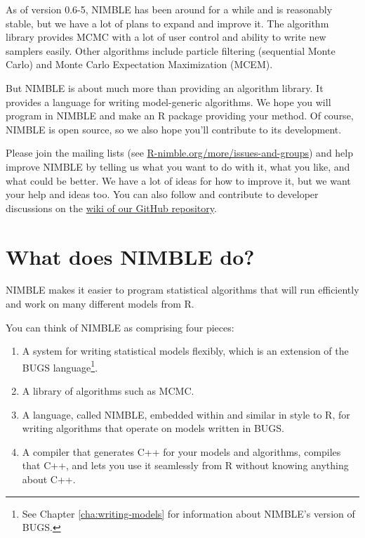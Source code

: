 \documentclass[12pt,oneside]{book}\usepackage[]{graphicx}\usepackage[]{color}
\newcommand{\ver}{0.6-5}
\begin{document}
As of version \ver, NIMBLE has been around for a while and is reasonably
stable, but we have a lot of plans to expand and improve it.  The
algorithm library provides MCMC with a lot of user control and ability
to write new samplers easily.  Other algorithms include particle
filtering (sequential Monte Carlo) and Monte Carlo Expectation
Maximization (MCEM).  

But NIMBLE is about much more than providing an algorithm library.  It
provides a language for writing model-generic algorithms.  We hope you
will program in NIMBLE and make an R package providing your method.
Of course, NIMBLE is open source, so we also hope you'll contribute to
its development.

Please join the mailing lists
(see \href{https://r-nimble.org/more/issues-and-groups}{R-nimble.org/more/issues-and-groups}) and help improve NIMBLE by
telling us what you want to do with it, what you like, and what could
be better.  We have a lot of ideas for how to improve it, but we want
your help and ideas too.  You can also follow and contribute to
developer discussions on the
\href{https://github.com/nimble-dev/nimble/wiki}{wiki of our GitHub
  repository}.

\section{What does NIMBLE do?}
\label{sec:what-is-nimble}

NIMBLE makes it easier to program statistical algorithms that will run
efficiently and work on many different models from R.

You can think of NIMBLE as comprising four pieces:

\begin{enumerate}
\item A system for writing statistical models flexibly, which is an
  extension of the BUGS language\footnote{See Chapter
    \ref{cha:writing-models} for information about NIMBLE's version of
    BUGS.}.
\item A library of algorithms such as MCMC.
\item A language, called NIMBLE, embedded within and similar in style
  to R, for writing algorithms that operate on models written in BUGS.
\item  A compiler that generates C++ for your models and algorithms,
  compiles that C++, and lets you use it seamlessly from R without
  knowing anything about C++.
\end{enumerate}
\end{document}
